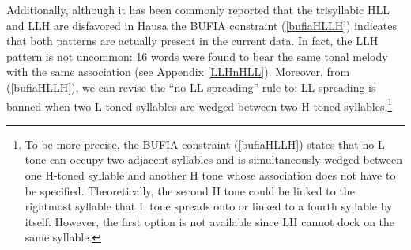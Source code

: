 \documentclass[11pt,letterpaper]{article}
\begin{document}
Additionally, although it has been commonly reported that the trisyllabic HLL and LLH are disfavored in Hausa \citep{zoll2003optimal,Leben,Newmanbook} the BUFIA constraint (\ref{bufiaHLLH}) indicates that both patterns are actually present in the current data. In fact, the LLH pattern is not uncommon: 16 words were found to bear the same tonal melody with the same association (see Appendix \ref{LLHnHLL}). Moreover, from (\ref{bufiaHLLH}), we can revise the ``no LL spreading'' rule to: LL spreading is banned when two L-toned syllables are wedged between two H-toned syllables.\footnote{To be more precise, the BUFIA constraint (\ref{bufiaHLLH}) states that no L tone can occupy two adjacent syllables and is simultaneously wedged between one H-toned syllable and another H tone whose association does not have to be specified. Theoretically, the second H tone could be linked to the rightmost syllable that L tone spreads onto or linked to a fourth syllable by itself. However, the first option is not available since LH cannot dock on the same syllable.}
\end{document}
